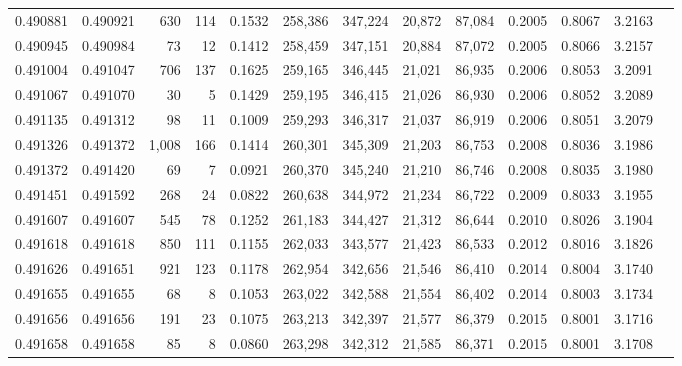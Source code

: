 \begin{tabular}{rrrrrrrrrrrrr}
0.490881 & 0.490921 &   630 &   114 &                                     0.1532 & 258,386 & 347,224 &  20,872 &  87,084 & 0.2005 & 0.8067 & 3.2163 \\
0.490945 & 0.490984 &    73 &    12 &                                     0.1412 & 258,459 & 347,151 &  20,884 &  87,072 & 0.2005 & 0.8066 & 3.2157 \\
0.491004 & 0.491047 &   706 &   137 &                                     0.1625 & 259,165 & 346,445 &  21,021 &  86,935 & 0.2006 & 0.8053 & 3.2091 \\
0.491067 & 0.491070 &    30 &     5 &                                     0.1429 & 259,195 & 346,415 &  21,026 &  86,930 & 0.2006 & 0.8052 & 3.2089 \\
0.491135 & 0.491312 &    98 &    11 &                                     0.1009 & 259,293 & 346,317 &  21,037 &  86,919 & 0.2006 & 0.8051 & 3.2079 \\
0.491326 & 0.491372 & 1,008 &   166 &                                     0.1414 & 260,301 & 345,309 &  21,203 &  86,753 & 0.2008 & 0.8036 & 3.1986 \\
0.491372 & 0.491420 &    69 &     7 &                                     0.0921 & 260,370 & 345,240 &  21,210 &  86,746 & 0.2008 & 0.8035 & 3.1980 \\
0.491451 & 0.491592 &   268 &    24 &                                     0.0822 & 260,638 & 344,972 &  21,234 &  86,722 & 0.2009 & 0.8033 & 3.1955 \\
0.491607 & 0.491607 &   545 &    78 &                                     0.1252 & 261,183 & 344,427 &  21,312 &  86,644 & 0.2010 & 0.8026 & 3.1904 \\
0.491618 & 0.491618 &   850 &   111 &                                     0.1155 & 262,033 & 343,577 &  21,423 &  86,533 & 0.2012 & 0.8016 & 3.1826 \\
0.491626 & 0.491651 &   921 &   123 &                                     0.1178 & 262,954 & 342,656 &  21,546 &  86,410 & 0.2014 & 0.8004 & 3.1740 \\
0.491655 & 0.491655 &    68 &     8 &                                     0.1053 & 263,022 & 342,588 &  21,554 &  86,402 & 0.2014 & 0.8003 & 3.1734 \\
0.491656 & 0.491656 &   191 &    23 &                                     0.1075 & 263,213 & 342,397 &  21,577 &  86,379 & 0.2015 & 0.8001 & 3.1716 \\
0.491658 & 0.491658 &    85 &     8 &                                     0.0860 & 263,298 & 342,312 &  21,585 &  86,371 & 0.2015 & 0.8001 & 3.1708 \\

\end{tabular}
